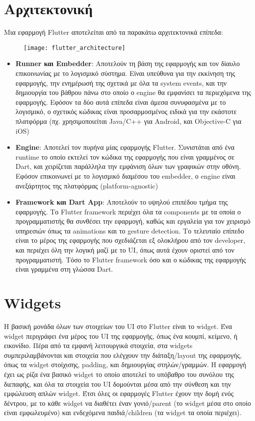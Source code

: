 \documentclass[../thesis.tex]{subfiles}
\begin{document}
\section{Αρχιτεκτονική}
Μια εφαρμογή Flutter αποτελείται από τα παρακάτω αρχιτεκτονικά επίπεδα:
\begin{figure}
    \centering
    \texttt{[image: flutter\_architecture]}
\end{figure}
\begin{itemize}
    \item \textbf{Runner και Embedder}: Αποτελούν τη βάση της εφαρμογής και τον δίαυλο επικοινωνίας με το λογισμικό σύστημα. Είναι υπεύθυνα για την εκκίνηση της εφαρμογής, την ενημέρωσή της σχετικά με όλα τα system events, και την δημιουργία του βάθρου πάνω στο οποίο ο engine θα εμφανίσει τα περιεχόμενα της εφαρμογής. Εφόσον τα δύο αυτά επίπεδα είναι άμεσα συνυφασμένα με το λογισμικό, ο σχετικός κώδικας είναι προσαρμοσμένος ειδικά για την εκάστοτε πλατφόρμα (πχ. χρησιμοποιείται Java/C++ για Android, και Objective-C για iOS)
    \item \textbf{Engine}: Αποτελεί τον πυρήνα μίας εφαρμογής Flutter. Συνιστάται από ένα runtime το οποίο εκτελεί τον κώδικα της εφαρμογής που είναι γραμμένος σε Dart, και χειρίζεται παράλληλα την εμφάνιση όλων των γραφικών στην οθόνη. Εφόσον επικοινωνεί με το λογισμικό διαμέσου του embedder, ο engine είναι ανεξάρτητος της πλατφόρμας (platform-agnostic)
    \item \textbf{Framework και Dart App}: Αποτελούν το υψηλού επιπέδου τμήμα της εφαρμογής. Το Flutter framework περιέχει όλα τα components με τα οποία ο προγραμματιστής θα συνθέσει την εφαρμογή, καθώς και εργαλεία για τον χειρισμό υπηρεσιών όπως τα animations και το gesture detection. Το τελευταίο επίπεδο είναι το μέρος της εφαρμογής που σχεδιάζεται εξ ολοκλήρου από τον developer, και περιέχει όλη την λογική μαζί με το UI, όπως αυτά έχουν οριστεί από τον προγραμματιστή. Τόσο το Flutter framework όσο και ο κώδικας της εφαρμογής είναι γραμμένα στη γλώσσα Dart.
\end{itemize}

\section{Widgets}
Η βασική μονάδα όλων των στοιχείων του UI στο Flutter είναι το widget.
Ένα widget περιγράφει ένα μέρος του UI της εφαρμογής, όπως ένα κουμπί, κείμενο, ή εικονίδιο.
Πέρα από τα εμφανή λειτουργικά στοιχεία, στα widgets συμπεριλαμβάνονται και στοιχεία που ελέγχουν την διάταξη/layout της εφαρμογής, όπως τα widget στοίχισης, padding, και δημιουργίας στηλών/γραμμών.
Η εφαρμογή έχει ως ρίζα ένα βασικό widget το οποίο αποτελεί το υπόβαθρο του συνόλου της διεπαφής, και όλα τα στοιχεία του UI δομούνται μέσα από την σύνθεση και την εμφώλευση απλών widget.
Έτσι όλες οι εφαρμογές Flutter έχουν την δομή ενός δέντρου, με το κάθε widget να διαθέτει έναν γονιό/parent (το widget μέσα στο οποίο είναι εμφωλευμένο) και ενδεχόμενα παιδιά/children (τα widget τα οποία περιέχει).
\end{document}
